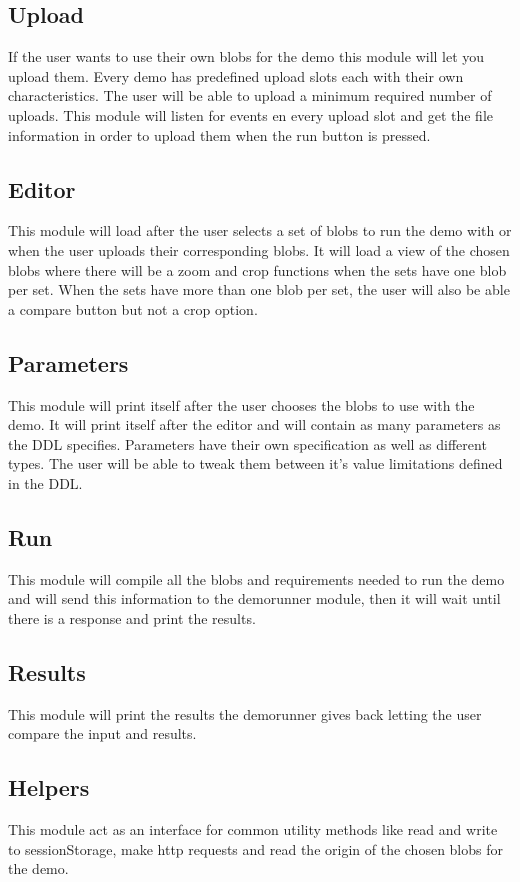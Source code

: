 \subsection{Upload}
If the user wants to use their own blobs for the demo this module will let you upload them. Every demo has predefined 
upload slots each with their own characteristics. The user will be able to upload a minimum required number of uploads.
This module will listen for events en every upload slot and get the file information in order to upload them when the run 
button is pressed.

\subsection{Editor}
This module will load after the user selects a set of blobs to run the demo with or when the user uploads their corresponding 
blobs. It will load a view of the chosen blobs where there will be a zoom and crop functions when the sets have 
one blob per set. When the sets have more than one blob per set, the user will also be able a compare button but not a crop 
option.

\subsection{Parameters}
This module will print itself after the user chooses the blobs to use with the demo. It will print itself after the editor and will 
contain as many parameters as the DDL specifies. Parameters have their own specification as well as different types.
The user will be able to tweak them between it's value limitations defined in the DDL.

\subsection{Run}
This module will compile all the blobs and requirements needed to run the demo and will send this information to the demorunner module, then it will wait until there is a response and print the results.

\subsection{Results}
This module will print the results the demorunner gives back letting the user compare the input and results.

\subsection{Helpers}
This module act as an interface for common utility methods like read and write to sessionStorage, make http requests and 
read the origin of the chosen blobs for the demo.


